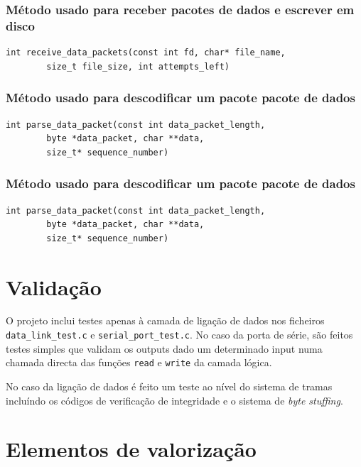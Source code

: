 \documentclass[a4paper,11pt,titlepage]{article}
\begin{document}
\subsubsection*{Método usado para receber pacotes de dados e escrever em disco}
\begin{lstlisting}[style=customc]
int receive_data_packets(const int fd, char* file_name, 
		size_t file_size, int attempts_left)
\end{lstlisting}

\subsubsection*{Método usado para descodificar um pacote pacote de dados}
\begin{lstlisting}[style=customc]
int parse_data_packet(const int data_packet_length,
		byte *data_packet, char **data,
		size_t* sequence_number)
\end{lstlisting}

\subsubsection*{Método usado para descodificar um pacote pacote de dados}
\begin{lstlisting}[style=customc]
int parse_data_packet(const int data_packet_length,
		byte *data_packet, char **data,
		size_t* sequence_number)
\end{lstlisting}

\section{Validação}

O projeto inclui testes apenas à camada de ligação de dados nos ficheiros \texttt{data\_link\_test.c} e \texttt{serial\_port\_test.c}. No caso da porta de série, são feitos testes simples que validam os outputs dado um determinado input numa chamada directa das funções \texttt{read} e \texttt{write} da camada lógica.

No caso da ligação de dados é feito um teste ao nível do sistema de tramas incluíndo os códigos de verificação de integridade e o sistema de \emph{byte stuffing}.

\section{Elementos de valorização}

\end{document}
